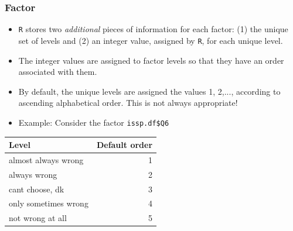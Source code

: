 \documentclass{beamer}\usepackage[]{graphicx}\usepackage[]{color}
\makeatletter
\newcommand{\hlstr}[1]{\textcolor[rgb]{0.667,0.267,0}{#1}}%
\newcommand{\hlopt}[1]{\textcolor[rgb]{0,0,0}{\textbf{#1}}}%
\newcommand{\hlstd}[1]{\textcolor[rgb]{0,0,0}{#1}}%
\newcommand{\hlkwb}[1]{\textcolor[rgb]{0,0,0.4}{\textbf{#1}}}%
\newcommand{\hlkwc}[1]{\textcolor[rgb]{0,0,0.4}{#1}}%
\newcommand{\hlkwd}[1]{\textcolor[rgb]{0,0.267,0.4}{#1}}%
\newenvironment{kframe}{%
 \def\at@end@of@kframe{}%
 \ifinner\ifhmode%
  \def\at@end@of@kframe{\end{minipage}}%
  \begin{minipage}{\columnwidth}%
 \fi\fi%
 \def\FrameCommand##1{\hskip\@totalleftmargin \hskip-\fboxsep
 \colorbox{shadecolor}{##1}\hskip-\fboxsep
     \hskip-\linewidth \hskip-\@totalleftmargin \hskip\columnwidth}%
 \MakeFramed {\advance\hsize-\width
   \@totalleftmargin\z@ \linewidth\hsize
   \@setminipage}}%
 {\par\unskip\endMakeFramed%
 \at@end@of@kframe}
\newenvironment{knitrout}{}{} %
\makeatother
\begin{document}
\begin{frame}
  \frametitle{Factor}
\begin{itemize}
  \item \texttt{R} stores two {\em additional} pieces of information for each factor: (1) the unique set of levels and (2) an integer value, assigned by \texttt{R}, for each unique level. 
  \item The integer values are assigned to factor levels so that they have an order associated with them.
  \item By default, the unique levels are assigned the values 1, 2,..., according to ascending alphabetical order. This is not always appropriate! 
  \item Example: Consider the factor \texttt{issp.df\$Q6}
\end{itemize}
\begin{table}[h]
  \centering
  \begin{tabular}[h]{lr}
    Level  & Default order \\
    \hline
    almost always wrong  & 1\\
    always wrong         & 2\\
    cant choose, dk      & 3\\ 
    only sometimes wrong & 4\\
    not wrong at all     & 5\\
    \hline
  \end{tabular}
\end{table}
\end{frame}

\end{document}
